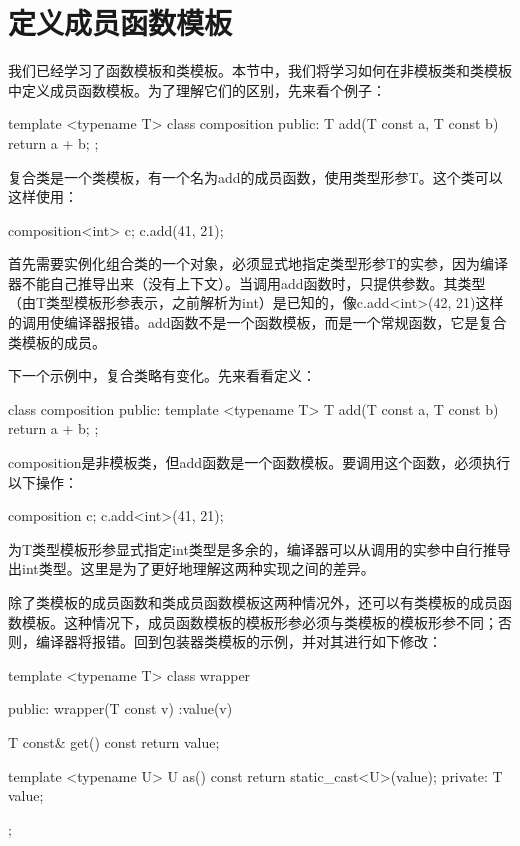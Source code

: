 \section{定义成员函数模板}
我们已经学习了函数模板和类模板。本节中，我们将学习如何在非模板类和类模板中定义成员函数模板。为了理解它们的区别，先来看个例子：

\begin{cpp}
template <typename T>
class composition
{
public:
	T add(T const a, T const b)
	{
		return a + b;
	}
};
\end{cpp}

复合类是一个类模板，有一个名为add的成员函数，使用类型形参T。这个类可以这样使用：

\begin{cpp}
composition<int> c;
c.add(41, 21);
\end{cpp}

首先需要实例化组合类的一个对象，必须显式地指定类型形参T的实参，因为编译器不能自己推导出来（没有上下文）。当调用add函数时，只提供参数。其类型（由T类型模板形参表示，之前解析为int）是已知的，像c.add<int>(42, 21)这样的调用使编译器报错。add函数不是一个函数模板，而是一个常规函数，它是复合类模板的成员。

下一个示例中，复合类略有变化。先来看看定义：

\begin{cpp}
class composition
{
public:
	template <typename T>
	T add(T const a, T const b)
	{
		return a + b;
	}
};
\end{cpp}

composition是非模板类，但add函数是一个函数模板。要调用这个函数，必须执行以下操作：

\begin{cpp}
composition c;
c.add<int>(41, 21);
\end{cpp}

为T类型模板形参显式指定int类型是多余的，编译器可以从调用的实参中自行推导出int类型。这里是为了更好地理解这两种实现之间的差异。

除了类模板的成员函数和类成员函数模板这两种情况外，还可以有类模板的成员函数模板。这种情况下，成员函数模板的模板形参必须与类模板的模板形参不同；否则，编译器将报错。回到包装器类模板的示例，并对其进行如下修改：

\begin{cpp}
template <typename T>
class wrapper
{
public:
	wrapper(T const v) :value(v)
	{}
	
	T const& get() const { return value; }
	
	template <typename U>
	U as() const
	{
		return static_cast<U>(value);
	}
private:
	T value;
};
\end{cpp}

